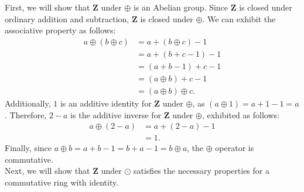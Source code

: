 \documentclass[10pt]{extarticle}
\begin{document}
  First, we will show that $\mathbf{Z}$ under $\oplus$ is an Abelian group. Since $\mathbf{Z}$ is closed under ordinary addition and subtraction, $\mathbf{Z}$ is closed under $\oplus$. We can exhibit the associative property as follows:
  \begin{align*}
    a\oplus(b\oplus c) &= a + (b\oplus c) - 1\\
                       &= a+(b+c-1) - 1\\
                       &= (a+b-1) + c - 1\\
                       &= (a\oplus b) + c - 1\\
                       &= (a\oplus b)\oplus c.
  \end{align*}
  Additionally, $1$ is an additive identity for $\mathbf{Z}$ under $\oplus$, as $(a\oplus 1) = a+1-1 = a$. Therefore, $2-a$ is the additive inverse for $\mathbf{Z}$ under $\oplus$, exhibited as follows:
  \begin{align*}
    a\oplus(2-a) &= a+(2-a) - 1\\
                 &= 1.
  \end{align*}
  Finally, since $a\oplus b = a+b-1 = b+a-1 = b\oplus a$, the $\oplus$ operator is commutative.\\

  Next, we will show that $\mathbf{Z}$ under $\odot$ satisfies the necessary properties for a commutative ring with identity.\\
\end{document}
